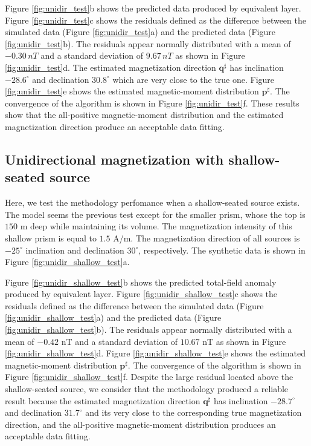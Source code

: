 Figure \ref{fig:unidir_test}b shows the predicted data produced by equivalent layer. 
Figure \ref{fig:unidir_test}c shows the residuals defined as the difference between the simulated data (Figure \ref{fig:unidir_test}a) and the predicted data (Figure \ref{fig:unidir_test}b). The residuals appear normally distributed with a mean of $-0.30 \, nT$ and a standard deviation of $9.67 \, nT$ as shown in Figure \ref{fig:unidir_test}d. The estimated magnetization direction $\mathbf{q}^\sharp$ has inclination $-28.6^\circ$ and declination $30.8^\circ$ which are very close to the true one. Figure \ref{fig:unidir_test}e shows the estimated magnetic-moment distribution $\mathbf{p}^\sharp$. The convergence of the algorithm is shown in Figure \ref{fig:unidir_test}f. These results show that the all-positive magnetic-moment distribution and the estimated magnetization direction produce an acceptable data fitting.

\subsection{Unidirectional magnetization with shallow-seated source}

Here, we test the methodology perfomance when a shallow-seated source exists. The model seems the previous test except for the smaller prism, whose the top is $150$ m deep while maintaining its volume. The magnetization intensity of this shallow prism is equal to $1.5$ A/m. The magnetization direction of all sources is $-25^\circ$ inclination and declination $30^\circ$, respectively. The synthetic data is shown in Figure \ref{fig:unidir_shallow_test}a.

Figure \ref{fig:unidir_shallow_test}b shows the predicted total-field anomaly produced by equivalent layer. Figure \ref{fig:unidir_shallow_test}c shows the residuals defined as the difference between the simulated data (Figure \ref{fig:unidir_shallow_test}a) and the predicted data (Figure \ref{fig:unidir_shallow_test}b). The residuals appear normally distributed with a mean of $-0.42$ nT and a standard deviation of $10.67$ nT as shown in Figure \ref{fig:unidir_shallow_test}d. Figure \ref{fig:unidir_shallow_test}e shows the estimated magnetic-moment distribution $\mathbf{p}^\sharp$. The convergence of the algorithm is shown in Figure \ref{fig:unidir_shallow_test}f. Despite the large residual located above the shallow-seated source, we consider that the methodology produced a reliable result because the estimated magnetization direction $\mathbf{q}^\sharp$ has inclination $-28.7^\circ$ and declination $31.7^\circ$ and its very close to the corresponding true magnetization direction, and the all-positive magnetic-moment distribution produces an acceptable data fitting. 

